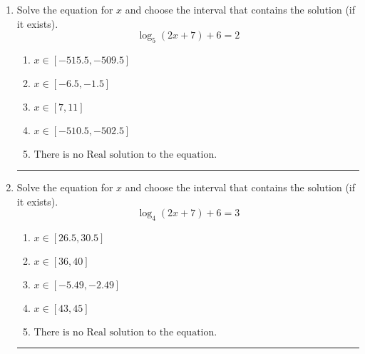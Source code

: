 \documentclass[14pt]{extbook}
\newcommand{\litem}[1]{\item#1\hspace*{-1cm}\rule{\textwidth}{0.4pt}}
\begin{document}
\begin{enumerate}
{\begin{enumerate}[label=\Alph*.]
\end{enumerate} }
\litem{
Solve the equation for $x$ and choose the interval that contains the solution (if it exists).\[ \log_{5}{(2x+7)}+6 = 2 \]\begin{enumerate}[label=\Alph*.]
\item \( x \in [-515.5, -509.5] \)
\item \( x \in [-6.5, -1.5] \)
\item \( x \in [7, 11] \)
\item \( x \in [-510.5, -502.5] \)
\item \( \text{There is no Real solution to the equation.} \)

\end{enumerate} }
\litem{
Solve the equation for $x$ and choose the interval that contains the solution (if it exists).\[ \log_{4}{(2x+7)}+6 = 3 \]\begin{enumerate}[label=\Alph*.]
\item \( x \in [26.5, 30.5] \)
\item \( x \in [36, 40] \)
\item \( x \in [-5.49, -2.49] \)
\item \( x \in [43, 45] \)
\item \( \text{There is no Real solution to the equation.} \)

\end{enumerate} }
\end{enumerate}
\end{document}
